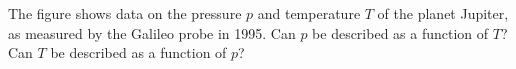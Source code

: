 The figure shows data on the pressure $p$ and temperature $T$
of the planet Jupiter, as measured by the Galileo probe in 1995.
Can $p$ be described as a function of $T$? Can $T$ be described as a function of $p$?
